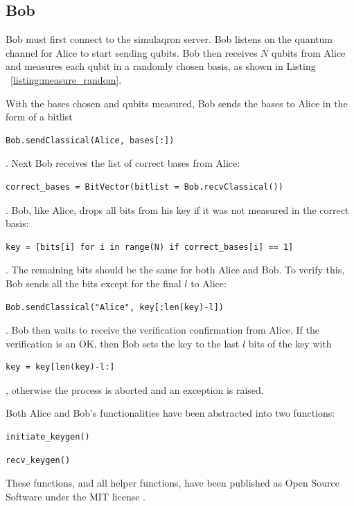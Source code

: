 \subsection{Bob}
Bob must first connect to the simulaqron server.
Bob listens on the quantum channel for Alice to start sending qubits.
Bob then receives $N$ qubits from Alice and measures each qubit in a randomly chosen basis, as shown in Listing ~\ref{listing:measure_random}.
\begin{figure}[htp]
\noindent
\begin{minipage}{\linewidth}
\begin{singlespace}

\end{singlespace}
\end{minipage}
\end{figure}
With the bases chosen and qubits measured, Bob sends the bases to Alice in the form of a bitlist\begin{verbatim}Bob.sendClassical(Alice, bases[:])\end{verbatim}.
Next Bob receives the list of correct bases from Alice: \begin{verbatim}correct_bases = BitVector(bitlist = Bob.recvClassical())\end{verbatim}.
Bob, like Alice, drops all bits from his key if it was not measured in the correct basis: \begin{verbatim}key = [bits[i] for i in range(N) if correct_bases[i] == 1]\end{verbatim}.
The remaining bits should be the same for both Alice and Bob. 
To verify this, Bob sends all the bits except for the final $l$ to Alice: \begin{verbatim}Bob.sendClassical("Alice", key[:len(key)-l])\end{verbatim}.
Bob then waits to receive the verification confirmation from Alice.
If the verification is an OK, then Bob sets the key to the last $l$ bits of the key with \begin{verbatim}key = key[len(key)-l:]\end{verbatim}
, otherwise the process is aborted and an exception is raised.

Both Alice and Bob's functionalities have been abstracted into two functions:
 \begin{verbatim}initiate_keygen()\end{verbatim}
 \begin{verbatim}recv_keygen()\end{verbatim}
These functions, and all helper functions, have been published as  Open Source Software under the MIT license \cite{libbb84}.

